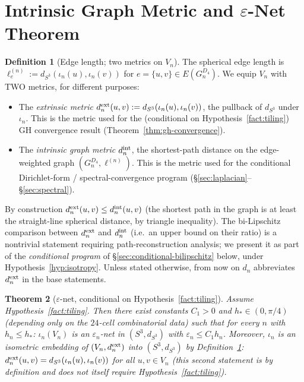 \documentclass[11pt, a4paper]{amsart}
\newtheorem{theorem}{Theorem}[section]
\theoremstyle{definition}
\newtheorem{definition}[theorem]{Definition}
\newcommand{\dsph}{d_{S^3}}
\begin{document}
\section{Intrinsic Graph Metric and $\varepsilon$-Net Theorem}
\label{sec:epsilon-net}

\begin{definition}[Edge length; two metrics on $V_n$]
\label{def:dn}
The spherical edge length is $\ell_e^{(n)} := \dsph(\iota_n(u),
\iota_n(v))$ for $e = \{u, v\} \in E(G_n^{D_4})$. We equip
$V_n$ with TWO metrics, for different purposes:
\begin{itemize}
\item The \emph{extrinsic metric} $d_n^{\rm ext}(u, v) :=
  \dsph(\iota_n(u), \iota_n(v))$, the pullback of $\dsph$ under
  $\iota_n$. This is the metric used for the (conditional on Hypothesis~\ref{fact:tiling}) GH
  convergence result (Theorem~\ref{thm:gh-convergence}).
\item The \emph{intrinsic graph metric} $d_n^{\rm int}$, the
  shortest-path distance on the edge-weighted graph
  $(G_n^{D_4}, \ell^{(n)})$. This is the metric used for the
  conditional Dirichlet-form / spectral-convergence program
  (\S\ref{sec:laplacian}--\S\ref{sec:spectral}).
\end{itemize}
By construction $d_n^{\rm ext}(u, v) \leq d_n^{\rm int}(u, v)$
(the shortest path in the graph is at least the straight-line
spherical distance, by triangle inequality). The
bi-Lipschitz comparison between $d_n^{\rm ext}$ and $d_n^{\rm
int}$ (i.e.\ an upper bound on their ratio) is a nontrivial
statement requiring path-reconstruction analysis; we present it
as part of the \emph{conditional program} of
\S\ref{sec:conditional-bilipschitz} below, under
Hypothesis~\ref{hyp:isotropy}. Unless stated otherwise, from
now on $d_n$ abbreviates $d_n^{\rm ext}$ in the base
statements.
\end{definition}

\begin{theorem}[$\varepsilon$-net, conditional on Hypothesis~\ref{fact:tiling}]
\label{thm:epsilon-net}
Assume Hypothesis~\ref{fact:tiling}. Then there exist constants
$C_1 > 0$ and $h_\ast \in (0, \pi/4)$ (depending only on the
$24$-cell combinatorial data) such that for every $n$ with
$h_n \leq h_\ast$: $\iota_n(V_n)$ is an $\varepsilon_n$-net in
$(S^3, \dsph)$ with $\varepsilon_n \leq C_1 h_n$. Moreover,
$\iota_n$ is an isometric embedding of $(V_n, d_n^{\rm ext})$
into $(S^3, \dsph)$ by Definition~\ref{def:dn}: $d_n^{\rm ext}(u, v) =
\dsph(\iota_n(u), \iota_n(v))$ for all $u, v \in V_n$ (this second
statement is by definition and does not itself require Hypothesis~\ref{fact:tiling}).
\end{theorem}
\end{document}
